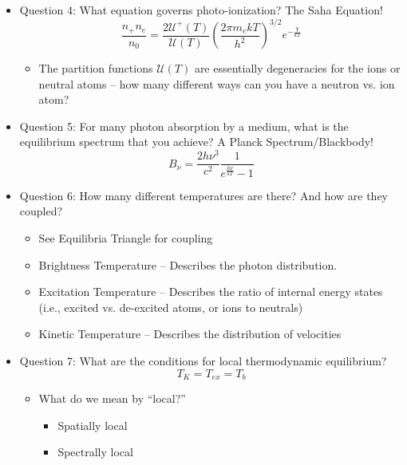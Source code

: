 \documentclass{article}
\newcommand{\planck}{\frac{2h\nu^3}{c^2} \frac{1}{e^{\frac{h\nu}{kT}} - 1}}
\begin{document}
\begin{itemize}
\begin{itemize}
\begin{itemize}
        \end{itemize}
    \end{itemize}
    \item Question 4: What equation governs photo-ionization? The Saha Equation!
    \begin{equation}
        \frac{n_+ n_e}{n_0} = \frac{2 \mathcal{U}^+(T)}{\mathcal{U}(T)}\left(\frac{2\pi m_e kT}{h^2}\right)^{3/2}e^{-\frac{\chi}{kT}}
    \end{equation}
    \begin{itemize}
        \item The partition functions $\mathcal{U}(T)$ are essentially degeneracies for the ions or neutral atoms -- how many different ways can you have a neutron vs. ion atom? 
    \end{itemize}
    \item Question 5: For many photon absorption by a medium, what is the equilibrium spectrum that you achieve? A Planck Spectrum/Blackbody!
    \begin{equation}
        B_\nu = \planck
    \end{equation}
    \item Question 6: How many different temperatures are there? And how are they coupled?
    \begin{itemize}
    \item See Equilibria Triangle for coupling
        \item Brightness Temperature -- Describes the photon distribution. 
        \item Excitation Temperature -- Describes the ratio of internal energy states (i.e., excited vs. de-excited atoms, or ions to neutrals)
        \item Kinetic Temperature -- Describes the distribution of velocities
    \end{itemize}
    \item Question 7: What are the conditions for local thermodynamic equilibrium?
    \begin{equation}
        T_K = T_{ex} = T_b
    \end{equation}
    \begin{itemize}
        \item What do we mean by ``local?''
        \begin{itemize}
            \item Spatially local
            \item Spectrally local
        \end{itemize}

\end{itemize}
\end{itemize}
\end{document}

